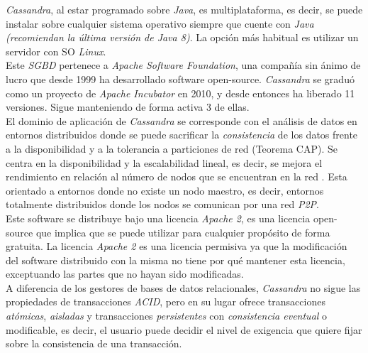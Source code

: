 \documentclass[11pt,a4paper]{article}
\begin{document}
\emph{Cassandra}, al estar programado sobre \emph{Java}, es multiplataforma, es decir, se puede instalar sobre cualquier sistema operativo siempre que cuente con \emph{Java (recomiendan la última versión de Java 8)}. La opción más habitual es utilizar un servidor con SO \emph{Linux}. \cite{AP:2}\\

Este \emph{SGBD} pertenece a \emph{Apache Software Foundation}, una compañía sin ánimo de lucro que desde 1999 ha desarrollado software open-source. \emph{Cassandra} se graduó como un proyecto de \emph{Apache Incubator} en 2010, y desde entonces ha liberado 11 versiones. Sigue manteniendo de forma activa 3 de ellas. \cite{AP:5} \\

El dominio de aplicación de \emph{Cassandra} se corresponde con el análisis de datos en entornos distribuidos donde se puede sacrificar la \emph{consistencia} de los datos frente a la disponibilidad y a la tolerancia a particiones de red (Teorema CAP). Se centra en la disponibilidad y la escalabilidad lineal, es decir, se mejora el rendimiento en relación al número de nodos que se encuentran en la red \cite{WIKI:5}. Esta orientado a entornos donde no existe un nodo maestro, es decir, entornos totalmente distribuidos donde los nodos se comunican por una red \emph{P2P}.\\

Este software se distribuye bajo una licencia \emph{Apache 2}, es una licencia open-source que implica que se puede utilizar para cualquier propósito de forma gratuita. La licencia \emph{Apache 2} es una licencia permisiva ya que la modificación del software distribuido con la misma no tiene por qué mantener esta licencia, exceptuando las partes que no hayan sido modificadas. \cite{WIKI:6}\\

A diferencia de los gestores de bases de datos relacionales, \emph{Cassandra} no sigue las propiedades de transacciones \emph{ACID}, pero en su lugar ofrece transacciones \emph{atómicas}, \emph{aisladas} y transacciones \emph{persistentes} con \emph{consistencia eventual} o modificable, es decir, el usuario puede decidir el nivel de exigencia que quiere fijar sobre la consistencia de una transacción. \cite{DS:1} \\
\end{document}
